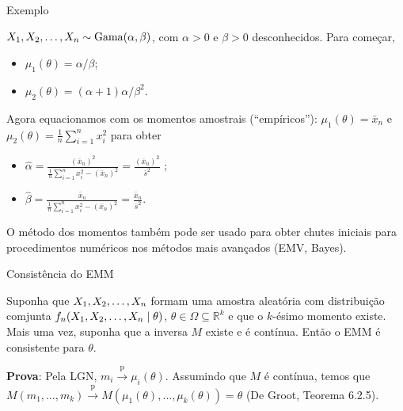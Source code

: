 \begin{frame}{Exemplo}
\begin{exemplo}
$X_1, X_2, \ldots, X_n \sim \operatorname{Gama}(\alpha, \beta)$, com $\alpha >0$ e $\beta>0$ desconhecidos.
Para começar,
\begin{itemize}
 \item $\mu_1(\theta) = \alpha/\beta$;
 \item $\mu_2(\theta) = (\alpha + 1)\alpha/\beta^2$.
\end{itemize}
Agora equacionamos com os momentos amostrais (``empíricos''):
$\mu_1(\theta) = \bar{x}_n$ e $\mu_2(\theta) = \frac{1}{n}\sum_{i=1}^n x_i^2$ para obter
\begin{itemize}
 \item $\hat{\alpha} = \frac{(\bar{x}_n)^2}{\frac{1}{n}\sum_{i=1}^n x_i^2 - (\bar{x}_n)^2} = \frac{(\bar{x}_n)^2}{\bar{s}^2}$ ;
 \item $\hat{\beta} = \frac{\bar{x}_n}{\frac{1}{n}\sum_{i=1}^n x_i^2 - (\bar{x}_n)^2} = \frac{\bar{x}_n}{\bar{s}^2}$.
\end{itemize}
\end{exemplo}
  \begin{obs}
  O método dos momentos também pode ser usado para obter chutes iniciais para procedimentos numéricos nos métodos mais avançados (EMV, Bayes).
 \end{obs}
\end{frame}

\begin{frame}{Consistência do EMM}
 \begin{theo}
    Suponha que $X_1, X_2, \ldots, X_n$ formam uma amostra aleatória com distribuição comjunta $f_n(X_1, X_2, \ldots, X_n \mid \theta)$, $\theta \in \Omega \subseteq \mathbb{R}^k$ e que o $k$-ésimo momento existe.
    Mais uma vez, suponha que a inversa $M$ existe e é contínua.
    Então o EMM é consistente para $\theta$.
 \end{theo}
\textbf{Prova}: Pela LGN, $m_i \xrightarrow{\text{p}}  \mu_i(\theta)$.
Assumindo que $M$ é contínua, temos que $M(m_1, \ldots, m_k) \xrightarrow{\text{p}} M(\mu_1(\theta), \ldots, \mu_k(\theta)) = \theta$  (De Groot, Teorema 6.2.5).
\end{frame}


